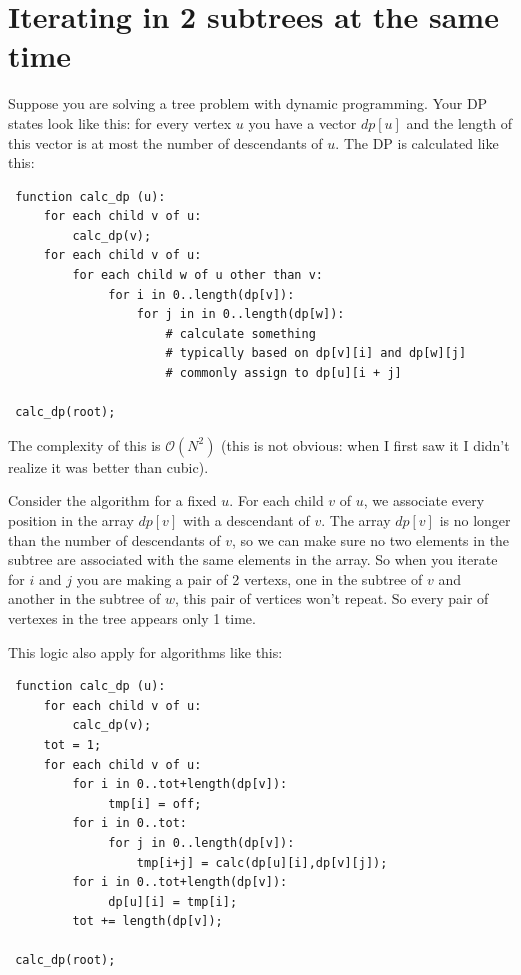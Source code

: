 \section{Iterating in 2 subtrees at the same time}

Suppose you are solving a tree problem with dynamic programming. Your DP states look like this: for every vertex $u$ you have a vector $dp[u]$ and the length of this vector is 
at most the number of descendants of $u$. The DP is calculated like this:
\begin{verbatim}
 function calc_dp (u):
     for each child v of u:
         calc_dp(v);
     for each child v of u:
         for each child w of u other than v:
              for i in 0..length(dp[v]):
                  for j in in 0..length(dp[w]):
                      # calculate something 
                      # typically based on dp[v][i] and dp[w][j]
                      # commonly assign to dp[u][i + j]
 
 calc_dp(root);
\end{verbatim}

The complexity of this is $\mathcal{O}(N^2)$ (this is not obvious: when I first saw it I didn't realize it was better than cubic).

Consider the algorithm for a fixed $u$. For each child $v$ of $u$, we associate every position in the array $dp[v]$ with a descendant of $v$. 
The array $dp[v]$ is no longer than the number of descendants of $v$, so we can make sure no two elements in the subtree are associated with the 
same elements in the array. So when you iterate for $i$ and $j$ you are making a pair of 2 vertexs, one in the subtree of $v$ and another in the
subtree of $w$, this pair of vertices won't repeat. So every pair of vertexes in the tree appears only 1 time.

This logic also apply for algorithms like this:
\begin{verbatim}
 function calc_dp (u):
     for each child v of u:
         calc_dp(v);
     tot = 1;
     for each child v of u:
         for i in 0..tot+length(dp[v]):
              tmp[i] = off;
         for i in 0..tot:
              for j in 0..length(dp[v]):
                  tmp[i+j] = calc(dp[u][i],dp[v][j]);
         for i in 0..tot+length(dp[v]):
              dp[u][i] = tmp[i];
         tot += length(dp[v]);
 
 calc_dp(root);
\end{verbatim}
